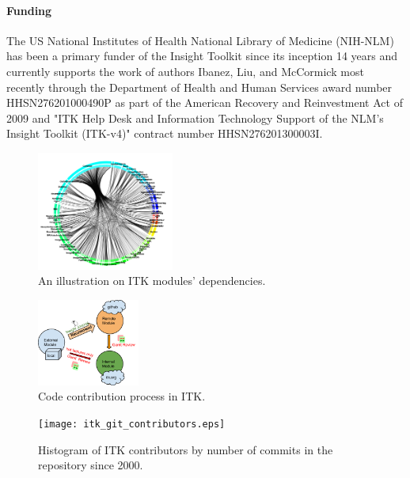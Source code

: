 \documentclass{frontiersENG} %
\begin{document}
\paragraph{Funding\textcolon} The US National Institutes of Health National
Library of Medicine (NIH-NLM) has been a primary funder of the Insight Toolkit since
its inception 14 years and currently supports the work of authors Ibanez, Liu,
and McCormick most recently through the Department of Health and Human
Services award number HHSN276201000490P as part of the American Recovery and
Reinvestment Act of 2009 and "ITK Help Desk and Information Technology Support
of the NLM's Insight Toolkit (ITK-v4)" contract number HHSN276201300003I.















\begin{figure}
  \centering
    \includegraphics[width=0.4\textwidth]{itk_module_dependency.png}
    \caption{ An illustration on ITK modules' dependencies.}
    \label{fig:itk_module_dependency}
\end{figure}

\begin{figure}
  \centering
    \includegraphics[width=0.3\textwidth]{itk_code_contribution.png}
    \caption{ Code contribution process in ITK.}
    \label{fig:itk_code_contribution}
\end{figure}


\begin{figure}
  \centering
    \texttt{[image: itk\_git\_contributors.eps]}
    \caption{Histogram of ITK contributors by number of commits in the repository since 2000.}
    \label{fig:ITKGitContributors}
\end{figure}
\end{document}
